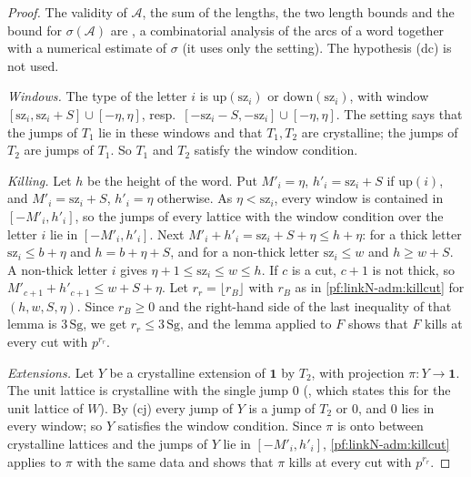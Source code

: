 \begin{proof}
The validity of $\mathcal A$, the sum of the lengths, the two length bounds and the bound for $\sigma(\mathcal A)$ are
, a combinatorial analysis of the arcs of a
word together with a numerical estimate of $\sigma$ (it uses only the setting). The hypothesis (dc) is not used.

\emph{Windows.} The type of the letter $i$ is $\mathrm{up}(\mathrm{sz}_i)$ or $\mathrm{down}(\mathrm{sz}_i)$, with window
$[\mathrm{sz}_i,\mathrm{sz}_i+S]\cup[-\eta,\eta]$, resp.\ $[-\mathrm{sz}_i-S,-\mathrm{sz}_i]\cup[-\eta,\eta]$. The setting
says that the jumps of $T_1$ lie in these windows and that $T_1,T_2$ are crystalline; the jumps of $T_2$ are jumps of
$T_1$. So $T_1$ and $T_2$ satisfy the window condition.

\emph{Killing.} Let $h$ be the height of the word. Put $M'_i=\eta$, $h'_i=\mathrm{sz}_i+S$ if $\mathrm{up}(i)$, and
$M'_i=\mathrm{sz}_i+S$, $h'_i=\eta$ otherwise. As $\eta<\mathrm{sz}_i$, every window is contained in $[-M'_i,h'_i]$, so the
jumps of every lattice with the window condition over the letter $i$ lie in $[-M'_i,h'_i]$. Next
$M'_i+h'_i=\mathrm{sz}_i+S+\eta\le h+\eta$: for a thick letter $\mathrm{sz}_i\le b+\eta$ and $h=b+\eta+S$, and for a
non-thick letter $\mathrm{sz}_i\le w$ and $h\ge w+S$. A non-thick letter $i$ gives $\eta+1\le\mathrm{sz}_i\le w\le h$. If
$c$ is a cut, $c+1$ is not thick, so $M'_{c+1}+h'_{c+1}\le w+S+\eta$. Let $r_r=\lfloor r_B\rfloor$ with $r_B$ as in
\cref{pf:linkN-adm:killcut} for $(h,w,S,\eta)$. Since $r_B\ge0$ and the right-hand side of the last inequality of that
lemma is $3\,\mathrm{Sg}$, we get $r_r\le3\,\mathrm{Sg}$, and the lemma applied to $F$ shows that $F$ kills at every cut
with $p^{r_r}$.

\emph{Extensions.} Let $Y$ be a crystalline extension of $\mathbf 1$ by $T_2$, with projection $\pi\colon Y\to\mathbf 1$.
The unit lattice is crystalline with the single jump $0$ (, which
states this for the unit lattice of $W$). By (cj) every jump of $Y$ is a jump of $T_2$ or $0$, and $0$ lies in every window;
so $Y$ satisfies the window condition. Since $\pi$ is onto between crystalline lattices and the jumps of $Y$ lie in
$[-M'_i,h'_i]$, \cref{pf:linkN-adm:killcut} applies to $\pi$ with the same data and shows that $\pi$ kills at every cut
with $p^{r_r}$.
\end{proof}

